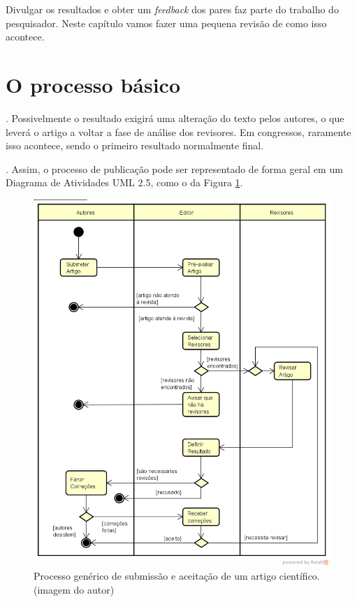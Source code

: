 \documentclass[openany]{book}
\begin{document}
 Divulgar os resultados e obter um \textit{feedback} dos pares faz parte do trabalho do pesquisador. Neste capítulo vamos fazer uma pequena revisão de como isso acontece.

\section{O processo básico}

. Possivelmente o resultado exigirá uma alteração do texto pelos autores, o que leverá o artigo a voltar a fase de análise dos revisores. Em congressos, raramente isso acontece, sendo o primeiro resultado normalmente final.

. Assim, o processo de publicação pode ser representado de forma geral em um Diagrama de Atividades UML 2.5, como o da Figura \ref{fig:processo}.


\begin{figure}
    \centering
    \includegraphics[width=0.7\linewidth]{imagens/ProcessoDeSubmissao.png}
    \caption[Processo genérico de submissão e aceitação de um artigo científico]{Processo genérico de submissão e aceitação de um artigo científico. (imagem do autor)}
    \label{fig:processo}
\end{figure}
\end{document}
